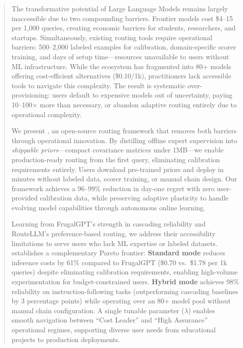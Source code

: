 
\begin{abstract}
The transformative potential of Large Language Models remains largely inaccessible due to two compounding barriers. Frontier models cost \$4--15 per 1,000 queries, creating economic barriers for students, researchers, and startups. Simultaneously, existing routing tools require operational barriers: 500--2,000 labeled examples for calibration, domain-specific scorer training, and days of setup time—resources unavailable to users without ML infrastructure. While the ecosystem has fragmented into 80+ models offering cost-efficient alternatives (\$0.10/1k), practitioners lack accessible tools to navigate this complexity. The result is systematic over-provisioning: users default to expensive models out of uncertainty, paying 10--100× more than necessary, or abandon adaptive routing entirely due to operational complexity.

We present \ours{}, an open-source routing framework that removes both barriers through operational innovation. By distilling offline expert supervision into \emph{shippable priors}---compact covariance matrices under 1MB---we enable production-ready routing from the first query, eliminating calibration requirements entirely. Users download pre-trained priors and deploy in minutes without labeled data, scorer training, or manual chain design. Our framework achieves a 96--99\% reduction in day-one regret with zero user-provided calibration data, while preserving adaptive plasticity to handle evolving model capabilities through autonomous online learning.

Learning from FrugalGPT's strength in cascading reliability and RouteLLM's preference-based routing, we address their accessibility limitations to serve users who lack ML expertise or labeled datasets. \ours{} establishes a complementary Pareto frontier: \textbf{Standard mode} reduces inference costs by 61\% compared to FrugalGPT (\$0.70 vs.\ \$1.78 per 1k queries) despite eliminating calibration requirements, enabling high-volume experimentation for budget-constrained users. \textbf{Hybrid mode} achieves 98\% reliability on instruction-following tasks (outperforming cascading baselines by 3 percentage points) while operating over an 80+ model pool without manual chain configuration. A single tunable parameter ($\lambda$) enables smooth navigation between ``Cost Leader'' and ``High Assurance'' operational regimes, supporting diverse user needs from educational projects to production deployments.


\end{abstract}
